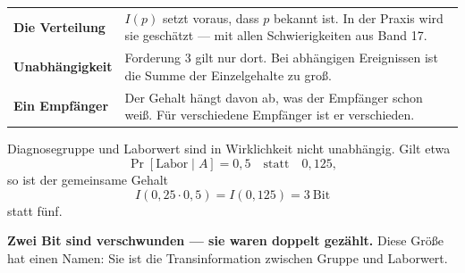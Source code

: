 \begin{warnung}
\begin{center}
{\small
\renewcommand{\arraystretch}{1.52}
\begin{tabular}{@{}P{2.8cm}P{5.8cm}@{}}
\toprule
\textbf{Die Verteilung} & $I(p)$ setzt voraus, dass $p$ bekannt ist. In der Praxis wird sie geschätzt --- mit allen Schwierigkeiten aus Band 17.\\
\textbf{Unabhängigkeit} & Forderung 3 gilt nur dort. Bei abhängigen Ereignissen ist die Summe der Einzelgehalte zu groß.\\
\textbf{Ein Empfänger} & Der Gehalt hängt davon ab, was der Empfänger schon weiß. Für verschiedene Empfänger ist er verschieden.\\
\bottomrule
\end{tabular}}
\end{center}

Diagnosegruppe und Laborwert sind in Wirklichkeit nicht unabhängig. Gilt etwa
\[ \Pr[\text{Labor}\mid A] = 0{,}5 \quad\text{statt}\quad 0{,}125 , \]
so ist der gemeinsame Gehalt
\[ I(0{,}25 \cdot 0{,}5) = I(0{,}125) = 3 \ \text{Bit} \]
statt fünf.

\begin{center}
\begin{minipage}{0.9\textwidth}
\textbf{Zwei Bit sind verschwunden --- sie waren doppelt gezählt.} Diese Größe hat einen Namen: Sie ist die Transinformation zwischen Gruppe und Laborwert.
\end{minipage}
\end{center}

\begin{center}
\begin{minipage}{0.88\textwidth}
\end{minipage}
\end{center}

\begin{center}
\begin{minipage}{0.88\textwidth}
\end{minipage}
\end{center}
\end{warnung}

